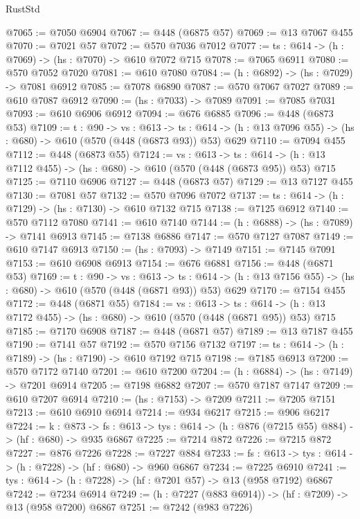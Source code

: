 \begin{lexlean}{RustStd}
\begin{coremodule}
@7065 := @7050 @6904
@7067 := @448 (@6875 @57)
@7069 := @13 @7067 @455
@7070 := @7021 @57
@7072 := @570 @7036 @7012
@7077 := {ts : @614} -> (h : @7069) -> (hs : @7070) -> @610 @7072 @715
@7078 := @7065 @6911
@7080 := @570 @7052 @7020
@7081 := @610 @7080
@7084 := (h : @6892) -> (hs : @7029) -> @7081 @6912
@7085 := @7078 @6890
@7087 := @570 @7067 @7027
@7089 := @610 @7087 @6912
@7090 := (hs : @7033) -> @7089
@7091 := @7085 @7031
@7093 := @610 @6906 @6912
@7094 := @676 @6885
@7096 := @448 (@6873 @53)
@7109 := {t : @90} ->
  {vs : @613} ->
  {ts : @614} -> (h : @13 @7096 @55) -> (hs : @680) -> @610 (@570 (@448 (@6873 @93)) @53) @629
@7110 := @7094 @455
@7112 := @448 (@6873 @55)
@7124 := {vs : @613} ->
  {ts : @614} -> (h : @13 @7112 @455) -> (hs : @680) -> @610 (@570 (@448 (@6873 @95)) @53) @715
@7125 := @7110 @6906
@7127 := @448 (@6873 @57)
@7129 := @13 @7127 @455
@7130 := @7081 @57
@7132 := @570 @7096 @7072
@7137 := {ts : @614} -> (h : @7129) -> (hs : @7130) -> @610 @7132 @715
@7138 := @7125 @6912
@7140 := @570 @7112 @7080
@7141 := @610 @7140
@7144 := (h : @6888) -> (hs : @7089) -> @7141 @6913
@7145 := @7138 @6886
@7147 := @570 @7127 @7087
@7149 := @610 @7147 @6913
@7150 := (hs : @7093) -> @7149
@7151 := @7145 @7091
@7153 := @610 @6908 @6913
@7154 := @676 @6881
@7156 := @448 (@6871 @53)
@7169 := {t : @90} ->
  {vs : @613} ->
  {ts : @614} -> (h : @13 @7156 @55) -> (hs : @680) -> @610 (@570 (@448 (@6871 @93)) @53) @629
@7170 := @7154 @455
@7172 := @448 (@6871 @55)
@7184 := {vs : @613} ->
  {ts : @614} -> (h : @13 @7172 @455) -> (hs : @680) -> @610 (@570 (@448 (@6871 @95)) @53) @715
@7185 := @7170 @6908
@7187 := @448 (@6871 @57)
@7189 := @13 @7187 @455
@7190 := @7141 @57
@7192 := @570 @7156 @7132
@7197 := {ts : @614} -> (h : @7189) -> (hs : @7190) -> @610 @7192 @715
@7198 := @7185 @6913
@7200 := @570 @7172 @7140
@7201 := @610 @7200
@7204 := (h : @6884) -> (hs : @7149) -> @7201 @6914
@7205 := @7198 @6882
@7207 := @570 @7187 @7147
@7209 := @610 @7207 @6914
@7210 := (hs : @7153) -> @7209
@7211 := @7205 @7151
@7213 := @610 @6910 @6914
@7214 := @934 @6217
@7215 := @906 @6217
@7224 := {k : @873} ->
  {fs : @613} -> {tys : @614} -> (h : @876 (@7215 @55) @884) -> (hf : @680) -> @935 @6867
@7225 := @7214 @872
@7226 := @7215 @872
@7227 := @876 @7226
@7228 := @7227 @884
@7233 := {fs : @613} -> {tys : @614} -> (h : @7228) -> (hf : @680) -> @960 @6867
@7234 := @7225 @6910
@7241 := {tys : @614} -> (h : @7228) -> (hf : @7201 @57) -> @13 (@958 @7192) @6867
@7242 := @7234 @6914
@7249 := (h : @7227 (@883 @6914)) -> (hf : @7209) -> @13 (@958 @7200) @6867
@7251 := @7242 (@983 @7226)

\end{coremodule}
\end{lexlean}
